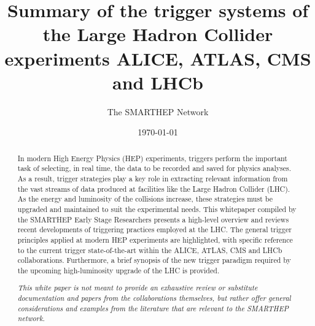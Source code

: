 \documentclass{smarthepnote}
\title{\vspace{-0.5cm}Summary of the trigger systems of the Large Hadron Collider experiments ALICE, ATLAS, CMS and LHCb\vspace{-0.25cm}}
\author{The SMARTHEP Network\vspace{-1cm}}
\date{\today}
\begin{document}
\maketitle

\begin{abstract}

\vspace{-0.25cm}
In modern High Energy Physics (HEP) experiments, triggers perform the important task of selecting, in real time, the data to be recorded and saved for physics analyses. As a result, trigger strategies play a key role in extracting relevant information from the vast streams of data produced at facilities like the Large Hadron Collider (LHC). As the energy and luminosity of the collisions increase, these strategies must be upgraded and maintained to suit the experimental needs. This whitepaper compiled by the SMARTHEP Early Stage Researchers presents a high-level overview and reviews recent developments of triggering practices employed at the LHC. The general trigger principles applied at modern HEP experiments are highlighted, with specific reference to the current trigger state-of-the-art within the ALICE, ATLAS, CMS and LHCb collaborations. Furthermore, a brief synopsis of the new trigger paradigm required by the upcoming high-luminosity upgrade of the LHC is provided. 

\textit{This white paper is not meant to provide an exhaustive review or substitute documentation and papers from the collaborations themselves, but rather offer general considerations and examples from the literature that are relevant to the SMARTHEP network.} 



\end{abstract}
\end{document}
